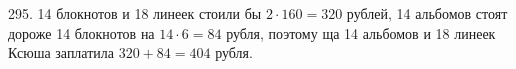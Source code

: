 295. 14 блокнотов и 18 линеек стоили бы $2\cdot160=320$ рублей, 14 альбомов стоят дороже 14 блокнотов на $14\cdot6=84$ рубля, поэтому ща 14 альбомов и 18 линеек Ксюша заплатила $320+84=404$ рубля.\\
